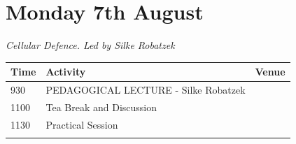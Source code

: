 \documentclass[12pt,]{book}
\theoremstyle{definition}
\theoremstyle{definition}
\theoremstyle{remark}
\begin{document}
\section*{Monday 7th August}\label{monday-7th-august}

\emph{Cellular Defence. Led by Silke Robatzek}

\begin{longtable}[]{@{}lll@{}}
\toprule
\begin{minipage}[b]{0.09\columnwidth}\raggedright\strut
Time\strut
\end{minipage} & \begin{minipage}[b]{0.39\columnwidth}\raggedright\strut
Activity\strut
\end{minipage} & \begin{minipage}[b]{0.13\columnwidth}\raggedright\strut
Venue\strut
\end{minipage}\tabularnewline
\midrule
\endhead
\begin{minipage}[t]{0.09\columnwidth}\raggedright\strut
930\strut
\end{minipage} & \begin{minipage}[t]{0.39\columnwidth}\raggedright\strut
PEDAGOGICAL LECTURE - Silke Robatzek\strut
\end{minipage} & \begin{minipage}[t]{0.13\columnwidth}\raggedright\strut
\strut
\end{minipage}\tabularnewline
\begin{minipage}[t]{0.09\columnwidth}\raggedright\strut
1100\strut
\end{minipage} & \begin{minipage}[t]{0.39\columnwidth}\raggedright\strut
Tea Break and Discussion\strut
\end{minipage} & \begin{minipage}[t]{0.13\columnwidth}\raggedright\strut
\strut
\end{minipage}\tabularnewline
\begin{minipage}[t]{0.09\columnwidth}\raggedright\strut
1130\strut
\end{minipage} & \begin{minipage}[t]{0.39\columnwidth}\raggedright\strut
Practical Session\strut
\end{minipage} & \begin{minipage}[t]{0.13\columnwidth}\raggedright\strut
\strut
\end{minipage}\tabularnewline
\begin{minipage}[t]{0.09\columnwidth}\raggedright\strut

\end{minipage}
\end{longtable}
\end{document}
